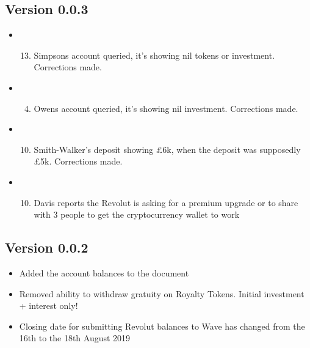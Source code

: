 \documentclass[letterpaper,10pt,openany,oneside,english]{sphinxmanual}
\begin{document}
\subsection{Version 0.0.3}
\label{\detokenize{releasenotes:version-0-0-3}}\begin{itemize}
\item {} \begin{enumerate}
\setcounter{enumi}{12}
\item {} 
Simpsons account queried, it’s showing nil tokens or investment.  Corrections made.

\end{enumerate}

\item {} \begin{enumerate}
\setcounter{enumi}{3}
\item {} 
Owens account queried, it’s showing nil investment.  Corrections made.

\end{enumerate}

\item {} \begin{enumerate}
\setcounter{enumi}{9}
\item {} 
Smith-Walker’s deposit showing £6k, when the deposit was supposedly £5k.  Corrections made.

\end{enumerate}

\item {} \begin{enumerate}
\setcounter{enumi}{9}
\item {} 
Davis reports the Revolut is asking for a premium upgrade or to share with 3 people to get the cryptocurrency wallet to work

\end{enumerate}

\end{itemize}


\subsection{Version 0.0.2}
\label{\detokenize{releasenotes:version-0-0-2}}\begin{itemize}
\item {} 
Added the account balances to the document

\item {} 
Removed ability to withdraw gratuity on Royalty Tokens. Initial investment + interest only!

\item {} 
Closing date for submitting Revolut balances to Wave has changed from the 16th to the 18th August 2019

\end{itemize}
\end{document}

